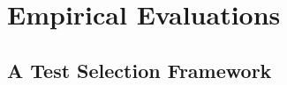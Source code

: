 %
%


\reversemarginpar
\setlength{\marginparwidth}{2cm}
\chapter{Empirical Evaluations}
\label{chap:Empirical Evaluations}
\newpage
\section{A Test Selection Framework}

